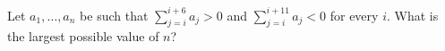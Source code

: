 Let $a_1, \ldots, a_n$ be such that $\sum_{j=i}^{i+6} a_j > 0$ and $\sum_{j=i}^{i+11} a_j < 0$ for every $i$. What is the largest possible value of $n$?
